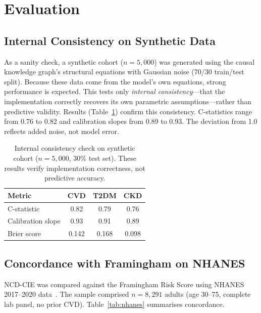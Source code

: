 \documentclass[runningheads]{llncs}
\begin{document}
\section{Evaluation}\label{sec:validation}

\subsection{Internal Consistency on Synthetic Data}\label{sec:synthetic}

As a sanity check, a synthetic cohort ($n = 5{,}000$) was generated
using the causal knowledge graph's structural equations with Gaussian
noise (70/30 train/test split).
Because these data come from the model's own equations, strong
performance is expected.
This tests only \emph{internal consistency}---that the implementation
correctly recovers its own parametric assumptions---rather than
predictive validity.
Results (Table~\ref{tab:synthetic}) confirm this consistency.
C-statistics range from 0.76 to 0.82 and calibration slopes from
0.89 to 0.93.
The deviation from 1.0 reflects added noise, not model error.

\renewcommand{\arraystretch}{1.2}
\begin{table}[t]
\centering
\caption{Internal consistency check on synthetic cohort ($n = 5{,}000$,
30\% test set).  These results verify implementation correctness,
not predictive accuracy.}
\label{tab:synthetic}
\small
\begin{tabular}{@{}lccc@{}}
\toprule
\textbf{Metric} & \textbf{CVD} & \textbf{T2DM} & \textbf{CKD} \\
\midrule
C-statistic        & 0.82 & 0.79 & 0.76 \\
Calibration slope  & 0.93 & 0.91 & 0.89 \\
Brier score        & 0.142 & 0.168 & 0.098 \\
\bottomrule
\end{tabular}
\end{table}
\renewcommand{\arraystretch}{1.0}

\subsection{Concordance with Framingham on NHANES}\label{sec:nhanes}

NCD-CIE was compared against the Framingham Risk Score using NHANES
2017--2020 data~\cite{nhanes2020}.
The sample comprised $n = 8{,}291$ adults (age 30--75, complete lab
panel, no prior CVD).
Table~\ref{tab:nhanes} summarises concordance.
\end{document}
